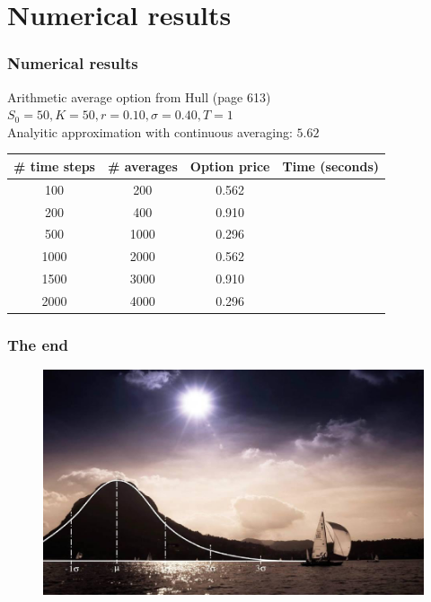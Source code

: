 \documentclass{beamer}
\begin{document}
\section{Numerical results}

\begin{frame}
\frametitle{Numerical results}
\begin{center}
Arithmetic average option from Hull (page 613)\\
$S_0=50, K = 50, r = 0.10, \sigma = 0.40, T = 1$ \\
Analyitic approximation with continuous averaging: $5.62$
\end{center}

\begin{table}
\begin{tabular}{c c c c}
\toprule
\textbf{\# time steps} & \textbf{\# averages} & \textbf{Option price} & \textbf{Time (seconds)}\\
\midrule
100 & 200 & 0.562 & \\
200 & 400 & 0.910 & \\
500 & 1000 & 0.296 & \\
1000 & 2000 & 0.562 & \\
1500 & 3000 & 0.910 & \\
2000 & 4000 & 0.296 & \\
\bottomrule
\end{tabular}
\end{table}
\end{frame}


\begin{frame}
\frametitle{The end}
\begin{figure}
	\includegraphics[scale=0.35]{end}
\end{figure}
\end{frame}

\end{document}
